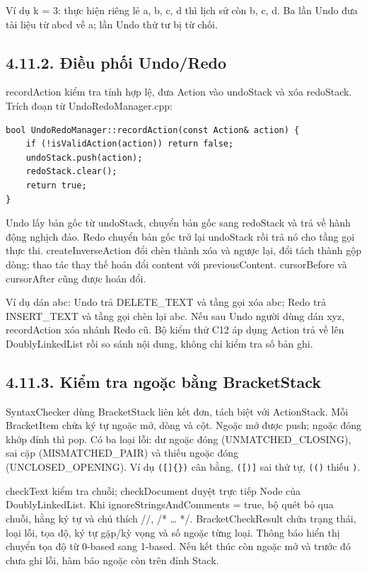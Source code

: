 Ví dụ k = 3: thực hiện riêng lẻ a, b, c, d thì lịch sử còn b, c, d. Ba
lần Undo đưa tài liệu từ abcd về a; lần Undo thứ tư bị từ chối.

\subsection{4.11.2. Điều phối
Undo/Redo}\label{tv4-22-4-11-ux111iux1ec1u-phux1ed1i-undoredo}

recordAction kiểm tra tính hợp lệ, đưa Action vào undoStack và xóa
redoStack. Trích đoạn từ UndoRedoManager.cpp:

\begin{verbatim}
bool UndoRedoManager::recordAction(const Action& action) {
    if (!isValidAction(action)) return false;
    undoStack.push(action);
    redoStack.clear();
    return true;
}
\end{verbatim}

Undo lấy bản gốc từ undoStack, chuyển bản gốc sang redoStack và trả về
hành động nghịch đảo. Redo chuyển bản gốc trở lại undoStack rồi trả nó
cho tầng gọi thực thi. createInverseAction đổi chèn thành xóa và ngược
lại, đổi tách thành gộp dòng; thao tác thay thế hoán đổi content với
previousContent. cursorBefore và cursorAfter cũng được hoán đổi.

Ví dụ dán abc: Undo trả DELETE\_TEXT và tầng gọi xóa abc; Redo trả
INSERT\_TEXT và tầng gọi chèn lại abc. Nếu sau Undo người dùng dán xyz,
recordAction xóa nhánh Redo cũ. Bộ kiểm thử C12 áp dụng Action trả về
lên DoublyLinkedList rồi so sánh nội dung, không chỉ kiểm tra số bản
ghi.

\subsection{4.11.3. Kiểm tra ngoặc bằng
BracketStack}\label{tv4-22-4-11-kiux1ec3m-tra-ngoux1eb7c-bux1eb1ng-bracketstack}

SyntaxChecker dùng BracketStack liên kết đơn, tách biệt với ActionStack.
Mỗi BracketItem chứa ký tự ngoặc mở, dòng và cột. Ngoặc mở được push;
ngoặc đóng khớp đỉnh thì pop. Có ba loại lỗi: dư ngoặc đóng
(UNMATCHED\_CLOSING), sai cặp (MISMATCHED\_PAIR) và thiếu ngoặc đóng
(UNCLOSED\_OPENING). Ví dụ \texttt{({[}{]}\{\})} cân bằng,
\texttt{({[}){]}} sai thứ tự, \texttt{(()} thiếu \texttt{)}.

checkText kiểm tra chuỗi; checkDocument duyệt trực tiếp Node của
DoublyLinkedList. Khi ignoreStringsAndComments = true, bộ quét bỏ qua
chuỗi, hằng ký tự và chú thích //, /* \ldots{} */. BracketCheckResult
chứa trạng thái, loại lỗi, tọa độ, ký tự gặp/kỳ vọng và số ngoặc từng
loại. Thông báo hiển thị chuyển tọa độ từ 0-based sang 1-based. Nếu kết
thúc còn ngoặc mở và trước đó chưa ghi lỗi, hàm báo ngoặc còn trên đỉnh
Stack.

